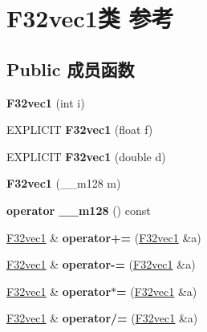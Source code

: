 \hypertarget{class_f32vec1}{}\section{F32vec1类 参考}
\label{class_f32vec1}
\subsection*{Public 成员函数}
\begin{DoxyCompactItemize}
\item 
\mbox{\label{class_f32vec1_a6329d55021c15bb7d3939402298466ac}} 
{\bfseries F32vec1} (int i)
\item 
\mbox{\label{class_f32vec1_ae8d4db19802d3ec6aeef446837246861}} 
E\+X\+P\+L\+I\+C\+IT {\bfseries F32vec1} (float f)
\item 
\mbox{\label{class_f32vec1_af954b1f2c7e202a7788f61dd417011d3}} 
E\+X\+P\+L\+I\+C\+IT {\bfseries F32vec1} (double d)
\item 
\mbox{\label{class_f32vec1_ae4014b2b22fd8be2b6c64148a2a9f1ce}} 
{\bfseries F32vec1} (\+\_\+\+\_\+m128 m)
\item 
\mbox{\label{class_f32vec1_a04caa95c6f19fbdeccacfd3a0fb6f052}} 
{\bfseries operator \+\_\+\+\_\+m128} () const
\item 
\mbox{\label{class_f32vec1_a3504faa18056ca4d4bbd562ad25811eb}} 
\hyperlink{class_f32vec1}{F32vec1} \& {\bfseries operator+=} (\hyperlink{class_f32vec1}{F32vec1} \&a)
\item 
\mbox{\label{class_f32vec1_af7199e0b1d1a2e5744068f7f2df13db1}} 
\hyperlink{class_f32vec1}{F32vec1} \& {\bfseries operator-\/=} (\hyperlink{class_f32vec1}{F32vec1} \&a)
\item 
\mbox{\label{class_f32vec1_adcdcf037ef9398fd4b4b351c5d852d9a}} 
\hyperlink{class_f32vec1}{F32vec1} \& {\bfseries operator$\ast$=} (\hyperlink{class_f32vec1}{F32vec1} \&a)
\item 
\mbox{\label{class_f32vec1_acbc3d02778d2c329776249381d02aa30}} 
\hyperlink{class_f32vec1}{F32vec1} \& {\bfseries operator/=} (\hyperlink{class_f32vec1}{F32vec1} \&a)

\end{DoxyCompactItemize}
